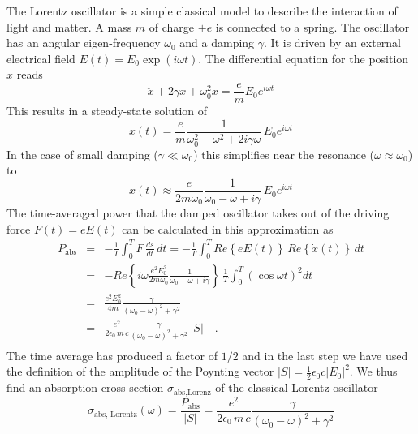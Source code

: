 The Lorentz oscillator is a simple classical model to describe the interaction of light and matter. A mass $m$ of charge $+e$ is connected to a spring. The oscillator has an angular eigen-frequency $\omega_0$ and a damping $\gamma$. It is driven by an external electrical field $E(t) = E_0 \exp(i \omega t)$. The differential equation for the position $x$ reads
\[
  \ddot{x} + 2  \gamma  \dot{x} + \omega_0^2 x =  \frac{e}{m} E_0 e^{i \omega t}
\]
This results in a steady-state solution of 
\[
  x(t) = \frac{e}{m}  \frac{1}{\omega_0^2 - \omega^2 +2  i \gamma \omega } \, E_0 e^{i \omega t} 
\]
In the case of small damping ($\gamma \ll \omega_0$) this simplifies near the resonance ($\omega \approx \omega_0$) to
\[
  x(t) \approx \frac{e}{2 m \omega_0}  \frac{1}{\omega_0 - \omega + i \gamma } \, E_0 e^{i \omega t} 
\]
The time-averaged power  that the damped oscillator takes out of the driving force $F(t) = e E(t)$ can be calculated in this approximation as
%
\begin{eqnarray*}
 P_{\text{abs}} &= &  - \frac{1}{T} \int_0^T F \, \frac{ds}{dt} \, dt =  
  - \frac{1}{T}  \int_0^T Re \left\{  e E(t) \right\}  \, Re \left\{ \dot{x}(t) \right\} \, dt \\
  & = & - Re \left\{i \omega  \frac{e^2  E_0^2 }{2 m \omega_0}  \frac{1}{\omega_0 - \omega +  i \gamma } \right\}  \,   \frac{1}{T}  \int_0^T \left( \cos \omega t \right)^2 dt \\
%
& = & \frac{e^2 E_0^2  }{4 m }  \frac{\gamma }{(\omega_0 - \omega)^2 +  \gamma ^2}  \\
&  = &  \frac{e^2  }{2 \epsilon_0 \, m \,c }  \frac{\gamma }{(\omega_0 - \omega)^2 +  \gamma ^2}  \, |S|  \quad .\\
\end{eqnarray*}
%
The time average has produced a factor of $1/2$ and in the last step we have used the definition of the amplitude of the Poynting vector $|S| = \frac{1}{2} \epsilon_0 c |E_0|^2$. 
We thus find an absorption cross section $\sigma_{\text{abs,Lorenz}}$ of the classical Lorentz oscillator
\[
 \sigma_{\text{abs, Lorentz}}(\omega) = \frac{ P_{\text{abs}} }{|S| } = \frac{e^2  }{2 \epsilon_0 \,  m \, c}  \frac{\gamma }{(\omega_0 - \omega)^2 +  \gamma ^2} 
\]

